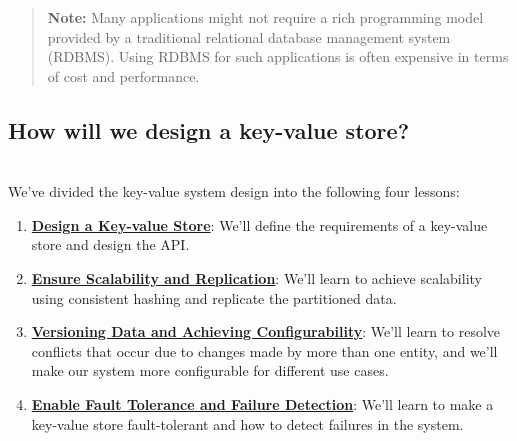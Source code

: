 \begin{quote}
\textbf{Note:} Many applications might not require a rich programming model provided by a traditional relational database management system (RDBMS). Using RDBMS for such applications is often expensive in terms of cost and performance.
\end{quote}
\subsection{How will we design a key-value store?}\label{yAw4h699VZV1M5-dIo21n}
\\
We've divided the key-value system design into the following four lessons:

\begin{enumerate}
\item
\protect{}\label{g7pCAMkSlZ6Y2oDrenLqB}
\href{https://www.educative.io/courses/grokking-the-system-design-interview/design-of-a-key-value-store}{\textbf{Design a Key-value Store}}: We'll define the requirements of a key-value store and design the API.
\item
\protect{}\label{zkYDzdKfWaNZOyK1p_S0E}
\href{https://www.educative.io/courses/grokking-the-system-design-interview/ensure-scalability-and-replication}{\textbf{Ensure Scalability and Replication}}: We'll learn to achieve scalability using consistent hashing and replicate the partitioned data.
\item
\protect{}\label{ud9BBOajZdNcPOUSVOY85}
\href{https://www.educative.io/courses/grokking-the-system-design-interview/versioning-data-and-achieving-configurability}{\textbf{Versioning Data and Achieving Configurability}}: We'll learn to resolve conflicts that occur due to changes made by more than one entity, and we'll make our system more configurable for different use cases.
\item
\protect{}\label{i5z95rhpvlnyDlIVeE0Hs}
\href{https://www.educative.io/courses/grokking-the-system-design-interview/enable-fault-tolerance-and-failure-detection}{\textbf{Enable Fault Tolerance and Failure Detection}}: We'll learn to make a key-value store fault-tolerant and how to detect failures in the system.
\end{enumerate}

